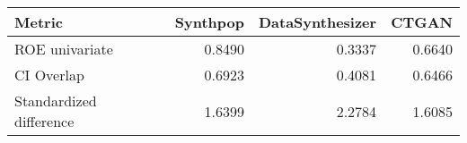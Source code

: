 \begin{tabular}{lrrr}
  \toprule
Metric & Synthpop & DataSynthesizer & CTGAN \\ 
  \midrule
\medskip ROE univariate & 0.8490 & 0.3337 & 0.6640 \\ 
  CI Overlap & 0.6923 & 0.4081 & 0.6466 \\ 
  Standardized difference & 1.6399 & 2.2784 & 1.6085 \\ 
   \bottomrule
\end{tabular}
